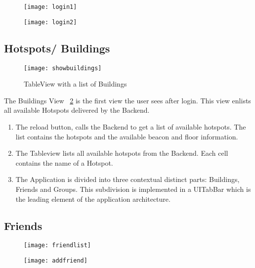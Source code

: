\begin{figure}
\centering
\begin{minipage}{.5\textwidth}
  \centering
  \texttt{[image: login1]}
  \label{fig:login1}
\end{minipage}%
\begin{minipage}{.5\textwidth}
  \centering
  \texttt{[image: login2]}
  \label{fig:login2}
\end{minipage}
\end{figure}

\subsection{Hotspots/ Buildings}

\begin{figure}
\centering
\begin{minipage}{.5\textwidth}
  \centering
\texttt{[image: showbuildings]}
\caption{TableView with a list of Buildings}
\label{fig:showbuildings}
\end{minipage}
\end{figure}

The Buildings View ~\ref{fig:showbuildings} is the first view the user sees after login. This view enlists all available Hotspots delivered by the Backend.

\begin{enumerate}
  \item The reload button, calls the Backend to get a list of available hotspots. The list contains the hotspots and the available beacon and floor information.
  \item The Tableview lists all available hotspots from the Backend. Each cell contains the name of a Hotspot.
  \item The Application is divided into three contextual distinct parts: Buildings, Friends and Groups. This subdivision is implemented in a UITabBar which is the leading element of the application architecture. 
\end{enumerate}

\subsection{Friends}

\begin{figure}
\centering
\begin{minipage}{.5\textwidth}
  \centering
  \texttt{[image: friendlist]}
  \label{fig:friendlist}
\end{minipage}%
\begin{minipage}{.5\textwidth}
  \centering
  \texttt{[image: addfriend]}
  \label{fig:addfriend}
\end{minipage}
\end{figure}

